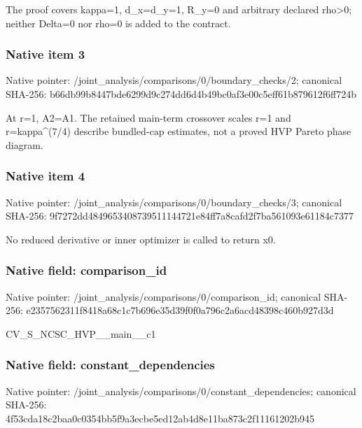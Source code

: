 \documentclass[10pt,a4paper]{article}
\begin{document}
\begingroup\raggedright\sloppy The proof covers kappa=\allowbreak{}1,\allowbreak{} d\_\allowbreak{}x=\allowbreak{}d\_\allowbreak{}y=\allowbreak{}1,\allowbreak{} R\_\allowbreak{}y=\allowbreak{}0 and arbitrary declared rho>0;\allowbreak{} neither Delta=\allowbreak{}0 nor rho=\allowbreak{}0 is added to the contract.\par\endgroup

\subsubsection{Native item 3}
Native pointer: /joint\_\allowbreak{}analysis/comparisons/0/boundary\_\allowbreak{}checks/2; canonical SHA-256: b66db99b8447bde6299d9c274dd6d4b49bc0af3e00c5eff61b879612f6ff724b

\begingroup\raggedright\sloppy At r=\allowbreak{}1,\allowbreak{} A2=\allowbreak{}A1. The retained main-term crossover scales r=\allowbreak{}1 and r=\allowbreak{}kappa\textasciicircum{}(7/\allowbreak{}4) describe bundled-cap estimates,\allowbreak{} not a proved HVP Pareto phase diagram.\par\endgroup

\subsubsection{Native item 4}
Native pointer: /joint\_\allowbreak{}analysis/comparisons/0/boundary\_\allowbreak{}checks/3; canonical SHA-256: 9f7272dd4849653408739511144721e84ff7a8cafd2f7ba561093e61184c7377

\begingroup\raggedright\sloppy No reduced derivative or inner optimizer is called to return x0.\par\endgroup

\subsubsection{Native field: comparison\_\allowbreak{}id}
Native pointer: /joint\_\allowbreak{}analysis/comparisons/0/comparison\_\allowbreak{}id; canonical SHA-256: e2357562311f8418a68c1c7b696e35d39f0f0a796c2a6acd48398c460b927d3d

\begingroup\raggedright\sloppy CV\_\allowbreak{}S\_\allowbreak{}NCSC\_\allowbreak{}HVP\_\allowbreak{}\_\allowbreak{}main\_\allowbreak{}\_\allowbreak{}c1\par\endgroup

\subsubsection{Native field: constant\_\allowbreak{}dependencies}
Native pointer: /joint\_\allowbreak{}analysis/comparisons/0/constant\_\allowbreak{}dependencies; canonical SHA-256: 4f53cda18c2baa0c0354bb5f9a3ecbe5ed12ab4d8e11ba873c2f11161202b945
\end{document}
